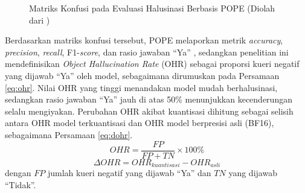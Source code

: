 \begin{figure}[htbp]
    \centering
    \caption{Matriks Konfusi pada Evaluasi Halusinasi Berbasis POPE (Diolah dari \cite{ref9})}
    \label{fig:konfusi}
\end{figure}

Berdasarkan matriks konfusi tersebut, POPE melaporkan metrik \textit{accuracy}, \textit{precision}, \textit{recall}, F1-\textit{score}, dan rasio jawaban ``Ya'' \cite{ref9}, sedangkan penelitian ini mendefinisikan \textit{Object Hallucination Rate} (OHR) sebagai proporsi kueri negatif yang dijawab ``Ya'' oleh model, sebagaimana dirumuskan pada Persamaan \eqref{eq:ohr}. Nilai OHR yang tinggi menandakan model mudah berhalusinasi, sedangkan rasio jawaban ``Ya'' jauh di atas 50\% menunjukkan kecenderungan selalu mengiyakan. Perubahan OHR akibat kuantisasi dihitung sebagai selisih antara OHR model terkuantisasi dan OHR model berpresisi asli (BF16), sebagaimana Persamaan \eqref{eq:dohr}.
\begin{equation}
OHR = \frac{FP}{FP + TN} \times 100\%
\label{eq:ohr}
\end{equation}
\begin{equation}
\Delta OHR = OHR_{kuantisasi} - OHR_{asli}
\label{eq:dohr}
\end{equation}
dengan $FP$ jumlah kueri negatif yang dijawab ``Ya'' dan $TN$ yang dijawab ``Tidak''.

